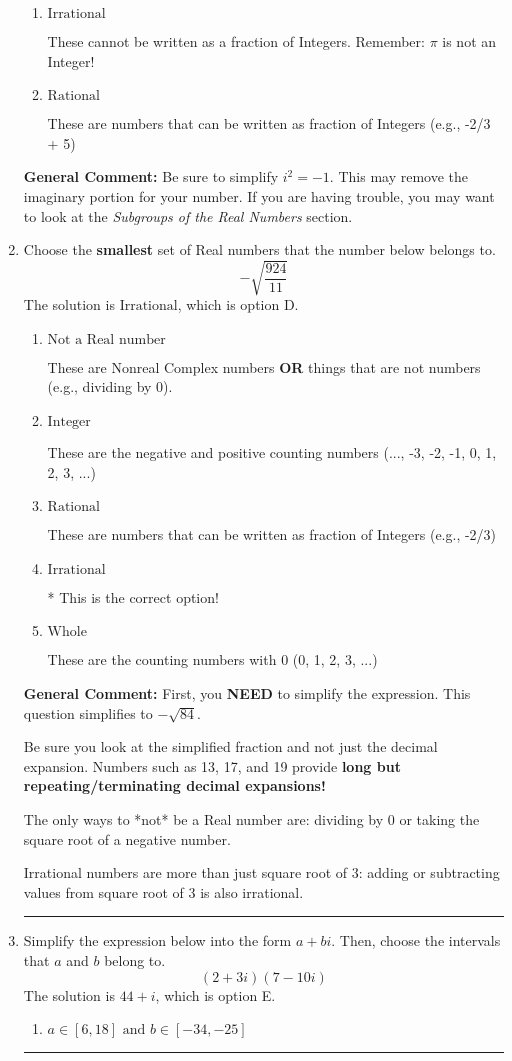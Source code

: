 \documentclass{extbook}[14pt]
\newcommand{\litem}[1]{\item #1

\rule{\textwidth}{0.4pt}}
\begin{document}
\begin{enumerate}
{\begin{enumerate}[label=\Alph*.]
This is a Complex number $(a+bi)$ that is not Real (has $i$ as part of the number).
\item \( \text{Irrational} \)

These cannot be written as a fraction of Integers. Remember: $\pi$ is not an Integer!
\item \( \text{Rational} \)

These are numbers that can be written as fraction of Integers (e.g., -2/3 + 5)
\end{enumerate}

\textbf{General Comment:} Be sure to simplify $i^2 = -1$. This may remove the imaginary portion for your number. If you are having trouble, you may want to look at the \textit{Subgroups of the Real Numbers} section.
}
\litem{
Choose the \textbf{smallest} set of Real numbers that the number below belongs to.
\[ -\sqrt{\frac{924}{11}} \]
The solution is \( \text{Irrational} \), which is option D.\begin{enumerate}[label=\Alph*.]
\item \( \text{Not a Real number} \)

These are Nonreal Complex numbers \textbf{OR} things that are not numbers (e.g., dividing by 0).
\item \( \text{Integer} \)

These are the negative and positive counting numbers (..., -3, -2, -1, 0, 1, 2, 3, ...)
\item \( \text{Rational} \)

These are numbers that can be written as fraction of Integers (e.g., -2/3)
\item \( \text{Irrational} \)

* This is the correct option!
\item \( \text{Whole} \)

These are the counting numbers with 0 (0, 1, 2, 3, ...)
\end{enumerate}

\textbf{General Comment:} First, you \textbf{NEED} to simplify the expression. This question simplifies to $-\sqrt{84}$. 
 
 Be sure you look at the simplified fraction and not just the decimal expansion. Numbers such as 13, 17, and 19 provide \textbf{long but repeating/terminating decimal expansions!} 
 
 The only ways to *not* be a Real number are: dividing by 0 or taking the square root of a negative number. 
 
 Irrational numbers are more than just square root of 3: adding or subtracting values from square root of 3 is also irrational.
}
\litem{
Simplify the expression below into the form $a+bi$. Then, choose the intervals that $a$ and $b$ belong to.
\[ (2 + 3 i)(7 - 10 i) \]
The solution is \( 44 + i \), which is option E.\begin{enumerate}[label=\Alph*.]
\item \( a \in [6, 18] \text{ and } b \in [-34, -25] \)


\end{enumerate}}
\end{enumerate}
\end{document}
